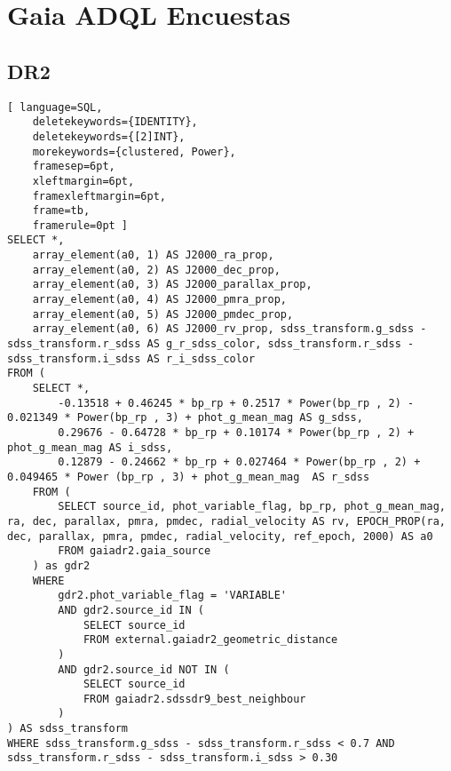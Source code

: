 \chapter{Gaia ADQL Encuestas}

\section{DR2}
\begin{lstlisting}[ language=SQL,
	deletekeywords={IDENTITY},
	deletekeywords={[2]INT},
	morekeywords={clustered, Power},
	framesep=6pt,
	xleftmargin=6pt,
	framexleftmargin=6pt,
	frame=tb,
	framerule=0pt ]
SELECT *, 
	array_element(a0, 1) AS J2000_ra_prop,
	array_element(a0, 2) AS J2000_dec_prop,
	array_element(a0, 3) AS J2000_parallax_prop,
	array_element(a0, 4) AS J2000_pmra_prop,
	array_element(a0, 5) AS J2000_pmdec_prop,
	array_element(a0, 6) AS J2000_rv_prop, sdss_transform.g_sdss - sdss_transform.r_sdss AS g_r_sdss_color, sdss_transform.r_sdss - sdss_transform.i_sdss AS r_i_sdss_color
FROM (
	SELECT *,
		-0.13518 + 0.46245 * bp_rp + 0.2517 * Power(bp_rp , 2) - 0.021349 * Power(bp_rp , 3) + phot_g_mean_mag AS g_sdss,
		0.29676 - 0.64728 * bp_rp + 0.10174 * Power(bp_rp , 2) + phot_g_mean_mag AS i_sdss,
		0.12879 - 0.24662 * bp_rp + 0.027464 * Power(bp_rp , 2) +	0.049465 * Power (bp_rp , 3) + phot_g_mean_mag	AS r_sdss
	FROM (
		SELECT source_id, phot_variable_flag, bp_rp, phot_g_mean_mag, ra, dec, parallax, pmra, pmdec, radial_velocity AS rv, EPOCH_PROP(ra, dec, parallax, pmra, pmdec, radial_velocity, ref_epoch, 2000) AS a0
		FROM gaiadr2.gaia_source
	) as gdr2
	WHERE
		gdr2.phot_variable_flag = 'VARIABLE'
		AND gdr2.source_id IN (
			SELECT source_id 
			FROM external.gaiadr2_geometric_distance
		)
		AND gdr2.source_id NOT IN (
			SELECT source_id 
			FROM gaiadr2.sdssdr9_best_neighbour
		)
) AS sdss_transform
WHERE sdss_transform.g_sdss - sdss_transform.r_sdss < 0.7 AND sdss_transform.r_sdss - sdss_transform.i_sdss > 0.30
\end{lstlisting}

